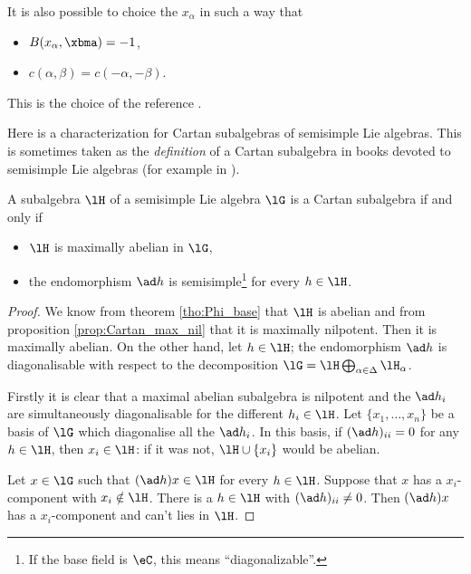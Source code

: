 \begin{remark}
It is also possible to choice the $ x_{\alpha}$ in such a way that 

\begin{itemize}
\item $B( x_{\alpha},\xbma)=-1$,
\item $c(\alpha,\beta)=c(-\alpha,-\beta)$.
\end{itemize}
This is the choice of the reference \cite{Hochschild}.
\end{remark}


Here is a characterization for Cartan subalgebras of semisimple Lie algebras. This is sometimes taken as the \emph{definition} of a Cartan subalgebra in books devoted to semisimple Lie algebras (for example in \cite{Helgason}).
\begin{proposition}     \label{PropCartanMaxAnel}
    A subalgebra $\lH$ of a semisimple Lie algebra $\lG$ is a Cartan subalgebra if and only if
    \begin{itemize}
        \item $\lH$ is maximally abelian in $\lG$,
        \item the endomorphism $\ad h$ is semisimple\footnote{If the base field is \( \eC\), this means ``diagonalizable''.} for every $h\in\lH$.
    \end{itemize}
\end{proposition}

\begin{proof}
 We know from theorem \ref{tho:Phi_base} that $\lH$ is abelian and from proposition \ref{prop:Cartan_max_nil} that it is maximally nilpotent. Then it is maximally abelian. On the other hand, let $h\in\lH$; the endomorphism $\ad h$ is diagonalisable with respect to the decomposition $\lG=\lH\bigoplus_{\alpha\in\Delta}\lH_{\alpha}$.

Firstly it is clear that a maximal abelian subalgebra is nilpotent and the $\ad h_i$ are simultaneously diagonalisable for the different $h_i\in\lH$. Let $\{x_1,\ldots,x_n\}$ be a basis of $\lG$ which diagonalise all the $\ad h_i$. In this basis, if $(\ad h)_{ii}=0$ for any $h\in\lH$, then $x_i\in\lH$: if it was not, $\lH\cup\{x_i\}$ would be abelian.

Let $x\in\lG$ such that $(\ad h)x\in\lH$ for every $h\in\lH$. Suppose that $x$ has a $x_i$-component with $x_i\notin\lH$. There is a $h\in\lH$ with $(\ad h)_{ii}\neq 0$. Then $(\ad h)x$ has a $x_i$-component and can't lies in $\lH$.

\end{proof}

